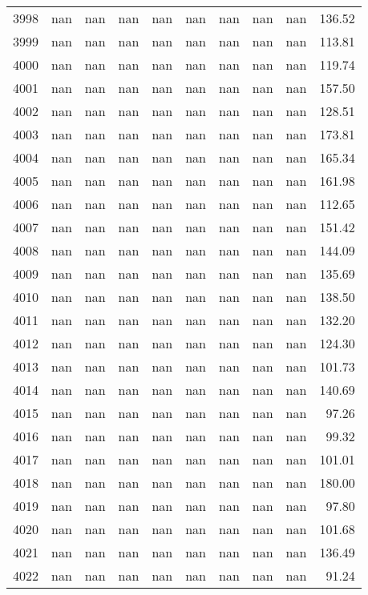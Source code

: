 \begin{tabular}{lrrrrrrrrr}
3998 & nan & nan & nan & nan & nan & nan & nan & nan & 136.52 \\
3999 & nan & nan & nan & nan & nan & nan & nan & nan & 113.81 \\
4000 & nan & nan & nan & nan & nan & nan & nan & nan & 119.74 \\
4001 & nan & nan & nan & nan & nan & nan & nan & nan & 157.50 \\
4002 & nan & nan & nan & nan & nan & nan & nan & nan & 128.51 \\
4003 & nan & nan & nan & nan & nan & nan & nan & nan & 173.81 \\
4004 & nan & nan & nan & nan & nan & nan & nan & nan & 165.34 \\
4005 & nan & nan & nan & nan & nan & nan & nan & nan & 161.98 \\
4006 & nan & nan & nan & nan & nan & nan & nan & nan & 112.65 \\
4007 & nan & nan & nan & nan & nan & nan & nan & nan & 151.42 \\
4008 & nan & nan & nan & nan & nan & nan & nan & nan & 144.09 \\
4009 & nan & nan & nan & nan & nan & nan & nan & nan & 135.69 \\
4010 & nan & nan & nan & nan & nan & nan & nan & nan & 138.50 \\
4011 & nan & nan & nan & nan & nan & nan & nan & nan & 132.20 \\
4012 & nan & nan & nan & nan & nan & nan & nan & nan & 124.30 \\
4013 & nan & nan & nan & nan & nan & nan & nan & nan & 101.73 \\
4014 & nan & nan & nan & nan & nan & nan & nan & nan & 140.69 \\
4015 & nan & nan & nan & nan & nan & nan & nan & nan & 97.26 \\
4016 & nan & nan & nan & nan & nan & nan & nan & nan & 99.32 \\
4017 & nan & nan & nan & nan & nan & nan & nan & nan & 101.01 \\
4018 & nan & nan & nan & nan & nan & nan & nan & nan & 180.00 \\
4019 & nan & nan & nan & nan & nan & nan & nan & nan & 97.80 \\
4020 & nan & nan & nan & nan & nan & nan & nan & nan & 101.68 \\
4021 & nan & nan & nan & nan & nan & nan & nan & nan & 136.49 \\
4022 & nan & nan & nan & nan & nan & nan & nan & nan & 91.24 \\

\end{tabular}
